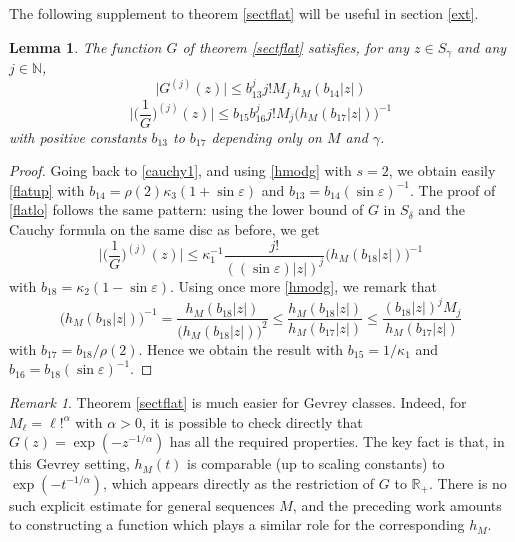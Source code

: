 \documentclass[a4paper]{amsart}
\theoremstyle{plain}
\newtheorem{lem}[subsubsection]{Lemma}
\theoremstyle{definition}
\theoremstyle{remark}
\newtheorem{rem}[subsubsection]{Remark}
\begin{document}
The following supplement to theorem \ref{sectflat} will be useful in section \ref{ext}.

\begin{lem}\label{flatuplo}
The function $ G $ of theorem \ref{sectflat} satisfies, for any $ z\in S_\gamma $ and
any $ j\in\mathbb{N} $, 
\begin{equation}\label{flatup}
\vert G^{(j)}(z)\vert \leq b_{13}^j j!M_j\, h_M(b_{14}\vert z\vert)
\end{equation}
\begin{equation}\label{flatlo}
\Big\vert\Big(\frac{1}{G}\Big)^{(j)}(z)\Big\vert \leq b_{15}b_{16}^j j!M_j
\big(h_M(b_{17}\vert z\vert)\big)^{-1}
\end{equation}
with positive constants $ b_{13} $ to $ b_{17} $ depending only on $ M $ and $ \gamma $.
\end{lem}
\begin{proof} Going back to \eqref{cauchy1}, and using \eqref{hmodg} with $ s=2 $, we
obtain easily \eqref{flatup} with $ b_{14}=\rho(2)\kappa_3(1+\sin\varepsilon) $ and
$ b_{13}=b_{14}(\sin\varepsilon)^{-1} $. The proof of \eqref{flatlo} follows the same pattern: using the lower bound of $ G $ in $ S_\delta $ and the Cauchy formula on the same disc as before, we get
\begin{equation*}
\Big\vert\Big(\frac{1}{G}\Big)^{(j)}(z)\Big\vert 
\leq \kappa_1^{-1}\frac{j!}{((\sin\varepsilon)\vert z\vert)^j}
\big(h_M(b_{18}\vert z\vert)\big)^{-1}
\end{equation*}
with $ b_{18}=\kappa_2(1-\sin\varepsilon) $. Using once more \eqref{hmodg}, we remark that
\begin{equation*}
\big(h_M(b_{18}\vert z\vert)\big)^{-1}= \frac{h_M(b_{18}\vert z\vert)}{\big(h_M(b_{18}\vert z\vert)\big)^2}\leq 
\frac{h_M(b_{18}\vert z\vert)}{h_M(b_{17}\vert z\vert)}\leq \frac{(b_{18}\vert z\vert)^j M_j}{h_M(b_{17}\vert z\vert)}
\end{equation*}
with $ b_{17}=b_{18}/\rho(2) $. Hence we
obtain the result with $ b_{15}=1/\kappa_1 $ and $ b_{16}=b_{18}(\sin\varepsilon)^{-1} $. 
\end{proof}

\begin{rem}\label{easier}
Theorem \ref{sectflat} is much easier for Gevrey classes. Indeed, for $ M_\ell=\ell!^\alpha $ with
$ \alpha>0 $, it is
possible to check directly that $ G(z)=\exp(-z^{-1/\alpha}) $ has all the required
properties. 
The key fact is that, in this Gevrey
setting, $ h_M(t) $ is comparable (up to scaling constants) to $ \exp(-t^{-1/\alpha}) $, which appears directly as the restriction of $ G $ to $ \mathbb{R}_+ $. There is no such
explicit estimate for general sequences $ M $, and the preceding work amounts to constructing a function which plays a similar role for the corresponding $ h_M $.
\end{rem}
\end{document}

